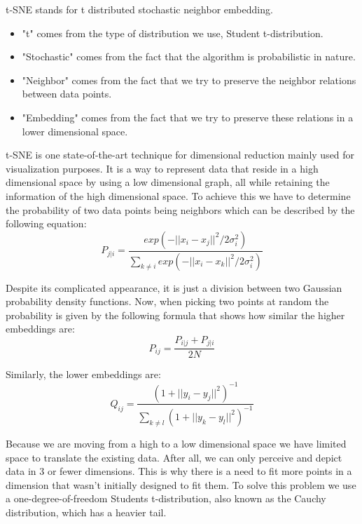 t-SNE stands for t distributed stochastic neighbor embedding. 
\begin{itemize}
    \item "t" comes from the type of distribution we use, Student t-distribution.
    \item "Stochastic" comes from the fact that the algorithm is probabilistic in nature.
    \item "Neighbor" comes from the fact that we try to preserve the neighbor relations between data points.
    \item "Embedding" comes from the fact that we try to preserve these relations in a lower dimensional space.
\end{itemize}
t-SNE is one state-of-the-art technique for dimensional reduction mainly used for visualization purposes. It is a 
way to represent data that reside in a high dimensional space by using a low dimensional graph, all while 
retaining the information of the high dimensional space. To achieve this we have to determine the probability
of two data points being neighbors which can be described by the following equation:
$$P_{j|i} = \frac{exp(-||x_i - x_j||^2 / 2\sigma_i^2)}{\sum_{k \neq i} exp(-||x_i - x_k||^2 / 2\sigma_i^2)}$$
\cite[page 3225]{accelerating_tsne}

Despite its complicated appearance, it is just a division between two Gaussian probability density functions.
Now, when picking two points at random the probability is given by the following formula that shows how similar
the higher embeddings are:
$$P_{ij} = \frac{P_{i|j} + P_{j|i}}{2N}$$
\cite[page 3226]{accelerating_tsne}

Similarly, the lower embeddings are: 
$$Q_{ij} = \frac{(1 + ||y_i - y_j||^2)^{-1}}{\sum_{k \neq l} (1 + ||y_k - y_l||^2)^{-1}}$$
\cite[page 3225]{accelerating_tsne}

Because we are moving from a high to a low dimensional space we have limited space to translate the existing
data. After all, we can only perceive and depict data in 3 or fewer dimensions. This is why there is a need to
fit more points in a dimension that wasn't initially designed to fit them. To solve this problem we use a 
one-degree-of-freedom Students t-distribution, also known as the Cauchy distribution, which has a heavier tail.

